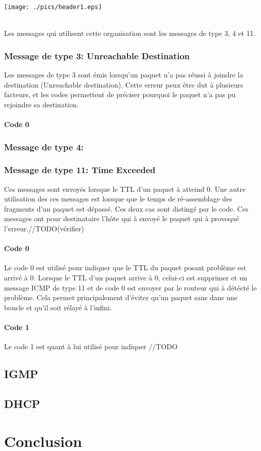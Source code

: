 \documentclass[twoside,openright,a4paper,11pt,french]{article}
\begin{document}
\texttt{[image: ./pics/header1.eps]}

\\Les messages qui utilisent cette organisation sont les messages de type 3, 4 et 11.

\subsubsection{Message de type 3: Unreachable Destination}
Les messages de type 3 sont émis lorsqu'un paquet n'a pas réussi à joindre la destination (Unreachable destination). Cette erreur peux être dut à plusieurs facteurs, et les codes permettent de préciser pourquoi le paquet n'a pas pu rejoindre sa destination.
\paragraph{Code 0}

\subsubsection{Message de type 4:}
\subsubsection{Message de type 11: Time Exceeded}
Ces messages sont envoyés lorsque le TTL d'un paquet à atteind 0. Une autre utilisation des ces messages est lorsque que le temps de ré-assemblage des fragments d'un paquet est dépassé. Ces deux cas sont distingé par le code. Ces messages ont pour destinataire l'hôte qui à envoyé le paquet qui à provoqué l'erreur.//TODO(vérifier)
\paragraph{Code 0}
Le code 0 est utilisé pour indiquer que le TTL du paquet posant problème est arrivé à 0. Lorsque le TTL d'un paquet arrive à 0, celui-ci est supprimer et un message ICMP de type 11 et de code 0 est envoyer par le routeur qui à détécté le problème. Cela permet principalement d'éviter qu'un paquet sans dans une boucle et qu'il soit rélayé à l'infini.
\paragraph{Code 1}
Le code 1 est quant à lui utilisé pour indiquer //TODO
\subsection{IGMP}
\subsection{DHCP}







\section{Conclusion}
\label{sec:ccl}

\cleardoublepage
{}


\end{document}
